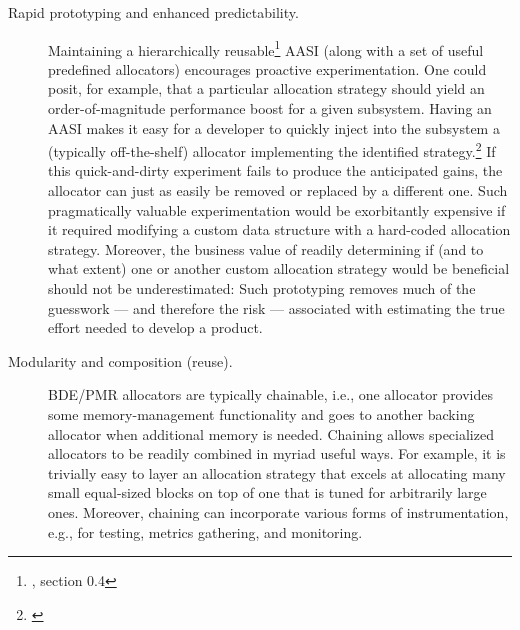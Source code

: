 \begin{description}
\item[Rapid prototyping and enhanced predictability.] Maintaining a hierarchically
reusable\footnote{\cite{lakos20}, section 0.4} AASI (along with a set of useful predefined allocators) encourages
proactive experimentation. One could posit, for example, that a particular allocation
strategy should yield an order-of-magnitude performance boost for a given
subsystem. Having an AASI makes it easy for a developer to quickly inject into the
subsystem a (typically off-the-shelf) allocator implementing the identified strategy.\footnote{\cite{halpern20a}}
If this quick-and-dirty experiment fails to produce the anticipated gains, the
allocator can just as easily be removed or replaced by a different one. Such
pragmatically valuable experimentation would be exorbitantly expensive if it
required modifying a custom data structure with a hard-coded allocation strategy.
Moreover, the business value of readily determining if (and to what extent) one or
another custom allocation strategy would be beneficial should not be
underestimated: Such prototyping removes much of the guesswork — and therefore
the risk — associated with estimating the true effort needed to develop a product.

\item[Modularity and composition (reuse).] BDE/PMR allocators are typically chainable,
i.e., one allocator provides some memory-management functionality and goes to
another backing allocator when additional memory is needed. Chaining allows
specialized allocators to be readily combined in myriad useful ways. For example, it
is trivially easy to layer an allocation strategy that excels at allocating many small
equal-sized blocks on top of one that is tuned for arbitrarily large ones. Moreover,
chaining can incorporate various forms of instrumentation, e.g., for testing, metrics
gathering, and monitoring.


\end{description}
